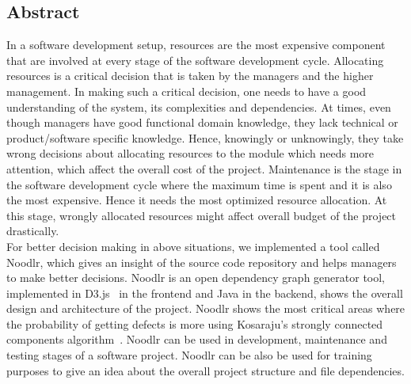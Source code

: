 
\subsection*{Abstract}

In a software development setup, resources are the most expensive component that are involved at every stage of the software development cycle. Allocating resources is a critical decision that is taken by the managers and the higher management. In making such a critical decision, one needs to have a good understanding of the system, its complexities and dependencies. At times, even though managers have good functional domain knowledge, they lack technical or product/software specific knowledge. Hence, knowingly or unknowingly, they take wrong decisions about allocating resources to the module which needs more attention, which affect the overall cost of the project. Maintenance is the stage in the software development cycle where the maximum time is spent and it is also the most expensive. Hence it needs the most optimized resource allocation. At this stage, wrongly allocated resources might affect overall budget of the project drastically. \\

For better decision making in above situations, we implemented a tool called Noodlr, which gives an insight of the source code repository and helps managers to make better decisions. Noodlr is an open dependency graph generator tool, implemented in D3.js~\cite{d3js} in the frontend and Java in the backend, shows the overall design and architecture of the project. Noodlr shows the most critical areas where the probability of getting defects is more using Kosaraju's strongly connected components algorithm~\cite{sharir1981strong}. Noodlr can be used in development, maintenance and testing stages of a software project. Noodlr can be also be used for training purposes to give an idea about the overall project structure and file dependencies.

